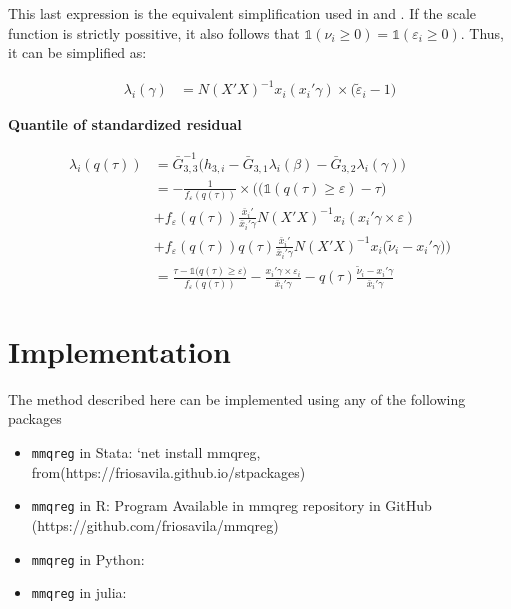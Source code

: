 \documentclass[
  authoryear,
  review,
  1p]{elsarticle}
\providecommand{\tightlist}{%
  \setlength{\itemsep}{0pt}\setlength{\parskip}{0pt}}\usepackage{longtable,booktabs,array}
\begin{document}
This last expression is the equivalent simplification used in
\citet{mss2019} and \citet{im2000}. If the scale function is strictly
possitive, it also follows that
\(\mathbb{1}(\nu_i \geq 0)= \mathbb{1}(\varepsilon_i \geq 0)\). Thus, it
can be simplified as:

\[\begin{aligned}
\lambda_i(\gamma) &= N(X'X)^{-1} x_i ( x_i' \gamma ) \times (\tilde \varepsilon_i -1\big)
\end{aligned}
\]

\textbf{Quantile of standardized residual}

\[\begin{aligned}
\lambda_i(q(\tau))&=\bar G_{3,3}^{-1}
\Big(
 h_{3,i}-\bar G_{3,1} \lambda_i(\beta)-\bar G_{3,2} \lambda_i(\gamma)
\Big) \\
&=-\frac{1}{f_{\varepsilon}(q(\tau))} \times \Bigg( \Big(\mathbb{1} ( q(\tau)  \geq \varepsilon  ) - \tau \Big)  \\
&+ f_{\varepsilon} (q(\tau)) \frac{\bar x_i'}{\bar x_i'\gamma} 
N (X'X)^{-1} x_i  ( x_i'\gamma \times \varepsilon) \\
&+ f_{\varepsilon}(q(\tau)) q(\tau) \frac{\bar x_i'}{\bar x_i'\gamma} N(X'X)^{-1} x_i   \big( \tilde \nu_i -x_i' 
  \gamma \big) 
\Bigg) \\
&=\frac{\tau-\mathbb{1}\big( q(\tau)  \geq \varepsilon  \big) }{f_{\varepsilon}(q(\tau))}
- \frac{ x_i'\gamma \times \varepsilon_i }{\bar x_i'\gamma} 
-  q(\tau) \frac{ \tilde \nu_i -x_i' 
  \gamma }{\bar x_i'\gamma} 
\end{aligned}
\]

\section{Implementation}\label{implementation}

The method described here can be implemented using any of the following
packages

\begin{itemize}
\tightlist
\item
  \texttt{mmqreg} in Stata: `net install mmqreg,
  from(https://friosavila.github.io/stpackages)
\item
  \texttt{mmqreg} in R: Program Available in mmqreg repository in GitHub
  (https://github.com/friosavila/mmqreg)
\item
  \texttt{mmqreg} in Python:
\item
  \texttt{mmqreg} in julia:
\end{itemize}
\end{document}
